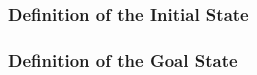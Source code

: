 \begin{comment}
\item \textit{attach} (\robot, \grip, \chstation)
\begin{itemize}
\item ;;The robot \robot attaches the gripper \grip.
\item \textit{precond}: \textit{gloc}(\grip)=chstation,
\item \textit{effects}: \textit{gloc}(\grip)=\robot
\end{itemize}

\item \textit{remove} (\robot, \grip, chstation)
\begin{itemize}
\item ;;The robot \robot removes the gripper \grip.
\item \textit{precond}: \textit{gloc}(\grip)=\robot,
\item \textit{effects}: \textit{gloc}(\grip)=\chstation
\end{itemize}
\end{itemize}
\end{comment}

\subsubsection{Definition of the Initial State}

\subsubsection{Definition of the Goal State}
